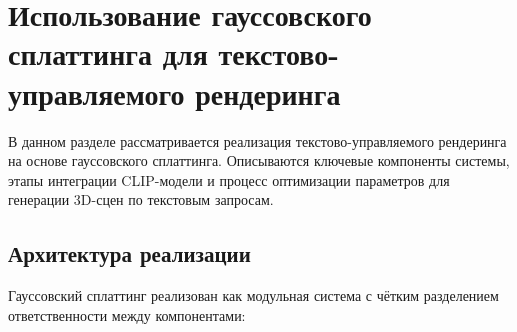 \chapter{Использование гауссовского сплаттинга для текстово-управляемого рендеринга}
\label{cha:text_to_3d}

В данном разделе рассматривается реализация текстово-управляемого рендеринга на основе гауссовского сплаттинга. Описываются ключевые компоненты системы, этапы интеграции CLIP-модели и процесс оптимизации параметров для генерации 3D-сцен по текстовым запросам.

\section{Архитектура реализации}

Гауссовский сплаттинг реализован как модульная система с чётким разделением ответственности между компонентами:

